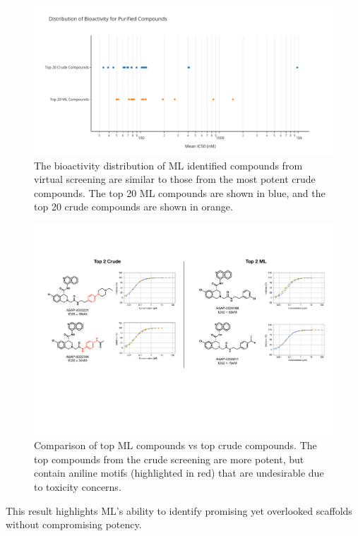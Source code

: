 \begin{figure}[!t]
    \centering
    \includegraphics[width=\textwidth]{Chapters/Crude/Figs/strip_plot.pdf}
    \caption{The bioactivity distribution of ML identified compounds from virtual screening are similar to those from the most potent crude compounds. The top 20 ML compounds are shown in blue, and the top 20 crude compounds are shown in orange.}
    \label{fig:strip}
\end{figure}

\begin{figure}[!t]
    \centering
    \includegraphics[width=\textwidth]{Chapters/Crude/Figs/ml_vs_crude.pdf}
    \caption{Comparison of top ML compounds vs top crude compounds. The top compounds from the crude screening are more potent, but contain aniline motifs (highlighted in red) that are undesirable due to toxicity concerns.}
    \label{fig:ml_vs_crude}
\end{figure}

This result highlights ML's ability to identify promising yet overlooked scaffolds without compromising potency. 

